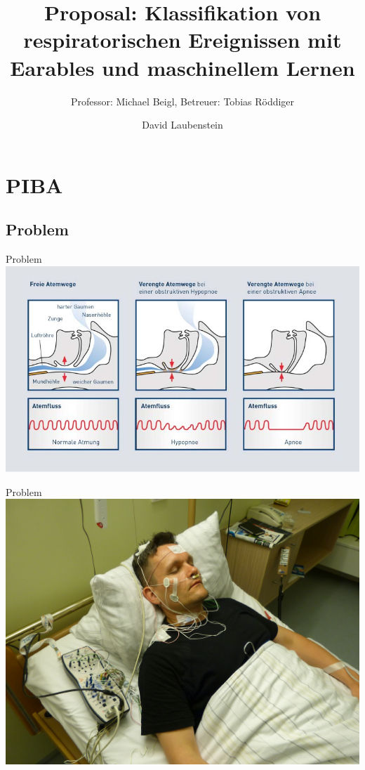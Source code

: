 \documentclass[18pt]{beamer}
\title[Proposal Bachelorarbeit]{Proposal: Klassifikation von respiratorischen Ereignissen mit Earables und maschinellem Lernen}
\subtitle{Professor: Michael Beigl, Betreuer: Tobias Röddiger}
\author{David Laubenstein}
\institute{Lehrstuhl Pervasive Computing Systems}
\begin{document}

\begin{frame}
\titlepage
\end{frame}


\section{PIBA}
\subsection{Problem}
\begin{frame}{Problem}
    \includegraphics[scale=0.4]{logos/was-passiert-bei-schlafapnoe}
\end{frame}

\begin{frame}{Problem}
    \includegraphics[scale=0.12]{logos/sleepLabor}
\end{frame}
\end{document}
